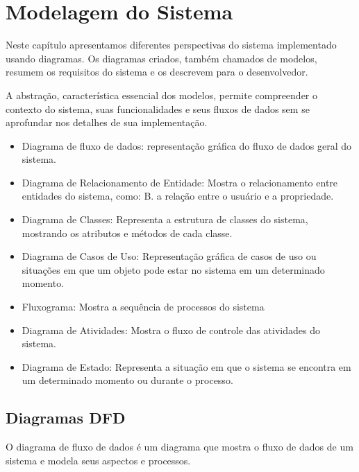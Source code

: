 
\chapter{Modelagem do Sistema}

Neste capítulo apresentamos diferentes perspectivas do sistema implementado usando diagramas. Os diagramas criados, também chamados de modelos, resumem os requisitos do sistema e os descrevem para o desenvolvedor.

A abstração, característica essencial dos modelos, permite compreender o contexto do sistema, suas funcionalidades e seus fluxos de dados sem se aprofundar nos detalhes de sua implementação.


\begin{itemize}
      \item Diagrama de fluxo de dados: representação gráfica do fluxo de dados geral do sistema.
      \item Diagrama de Relacionamento de Entidade: Mostra o relacionamento entre entidades do sistema, como: B. a relação entre o usuário e a propriedade.
      \item Diagrama de Classes: Representa a estrutura de classes do sistema, mostrando os atributos e métodos de cada classe.
      \item Diagrama de Casos de Uso: Representação gráfica de casos de uso ou situações em que um objeto pode estar no sistema em um determinado momento.
      \item Fluxograma: Mostra a sequência de processos do sistema
      \item Diagrama de Atividades: Mostra o fluxo de controle das atividades do sistema.
      \item Diagrama de Estado: Representa a situação em que o sistema se encontra em um determinado momento ou durante o processo.


\end{itemize}



\section{Diagramas DFD}
O diagrama de fluxo de dados é um diagrama que mostra o fluxo de dados de um sistema e modela seus aspectos e processos.

